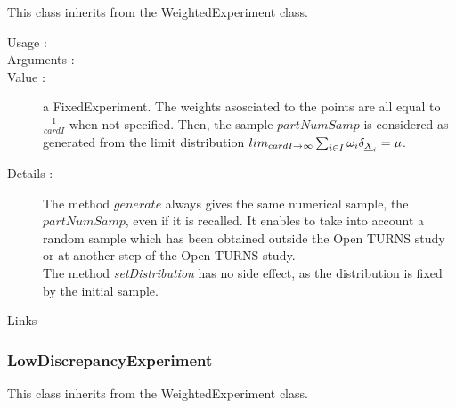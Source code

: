 This class inherits from the WeightedExperiment class.\\

\begin{description}

\item[Usage :] \rule{0pt}{1em}

\item[Arguments :]   \rule{0pt}{1em}
 
\item[Value :] a FixedExperiment. The weights asosciated to the points are all equal to $\displaystyle \frac{1}{cardI}$ when not specified. Then, the sample $partNumSamp$ is considered as generated from the limit distribution $lim_{card I \rightarrow\infty} \sum_{i \in I} \omega_i \delta_{{\underline{X}}_i} = \mu$.
 
\item[Details :]  The method $generate$  always gives  the same numerical sample, the $partNumSamp$, even if it is recalled. It enables to take into account a random sample which has been obtained outside the Open TURNS study or at another step of the Open TURNS study.\\
The method \emph{setDistribution} has no side effect, as the distribution is fixed by the initial sample.


\item[Links] \rule{0pt}{1em}
\end{description}

\newpage \subsubsection{ LowDiscrepancyExperiment}



This class inherits from the WeightedExperiment class.\\


